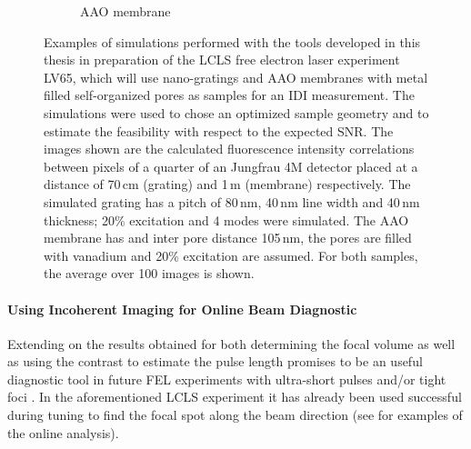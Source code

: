 \begin{figure}[p]
\begin{subfigure}[b]{0.37\textwidth}
		\caption{AAO membrane  }
		\label{fig:outlook_aao}
	\end{subfigure}
	\caption[Simulations in Preparation of LV65 Experiment]{Examples of simulations performed with the tools developed in this thesis in preparation of the LCLS free electron laser experiment LV65, which will use nano-gratings and AAO membranes with metal filled self-organized pores as samples for an IDI measurement. The simulations were used to chose an optimized sample geometry and to estimate the feasibility with respect to the expected SNR. The images shown are the calculated fluorescence intensity correlations between pixels of a quarter of an Jungfrau 4M detector placed at a distance of 70\,cm (grating) and 1\,m (membrane) respectively. The simulated grating has a pitch of 80\,nm, 40\,nm line width and 40\,nm thickness; 20\% excitation and 4 modes were simulated. The AAO membrane has and inter pore distance 105\,nm, the pores are filled with vanadium and 20\% excitation are assumed. For both samples, the average over 100 images is shown.}
\end{figure}


\paragraph{Using Incoherent Imaging for Online Beam Diagnostic}

Extending on the results obtained for both determining the focal volume as well as using the contrast to estimate the pulse length promises to be an useful diagnostic tool in future FEL experiments with ultra-short pulses and/or tight foci \cite{nakumura2020,inoue2019}. In the aforementioned LCLS experiment it has already been used successful during tuning to find the focal spot along the beam direction (see  for examples of the online analysis).


